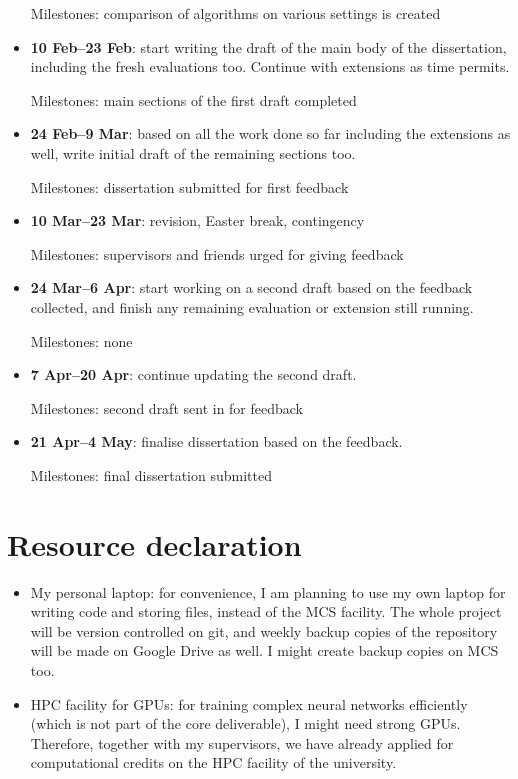 \documentclass[11pt,a4paper]{article}
\begin{document}
\begin{itemize}
    Milestones: comparison of algorithms on various settings is created
    \item
    \textbf{10 Feb--23 Feb}: start writing the draft of the main body of the dissertation, including the fresh evaluations too. Continue with extensions as time permits.
    
    Milestones: main sections of the first draft completed
    \item
    \textbf{24 Feb--9 Mar}: based on all the work done so far including the extensions as well, write initial draft of the remaining sections too.
    
    Milestones: dissertation submitted for first feedback
    \item
    \textbf{10 Mar--23 Mar}: revision, Easter break, contingency
    
    Milestones: supervisors and friends urged for giving feedback
    \item
    \textbf{24 Mar--6 Apr}: start working on a second draft based on the feedback collected, and finish any remaining evaluation or extension still running.
    
    Milestones: none
    \item
    \textbf{7 Apr--20 Apr}: continue updating the second draft.
    
    Milestones: second draft sent in for feedback
    \item
    \textbf{21 Apr--4 May}: finalise dissertation based on the feedback.
    
    Milestones: final dissertation submitted
\end{itemize}


\section{Resource declaration}

\begin{itemize}
    \item
    My personal laptop: for convenience, I am planning to use my own laptop for writing code and storing files, instead of the MCS facility. The whole project will be version controlled on git, and weekly backup copies of the repository will be made on Google Drive as well. I might create backup copies on MCS too.
    \item
    HPC facility for GPUs: for training complex neural networks efficiently (which is not part of the core deliverable), I might need strong GPUs. Therefore, together with my supervisors, we have already applied for computational credits on the HPC facility of the university.
\end{itemize}



\end{document}

